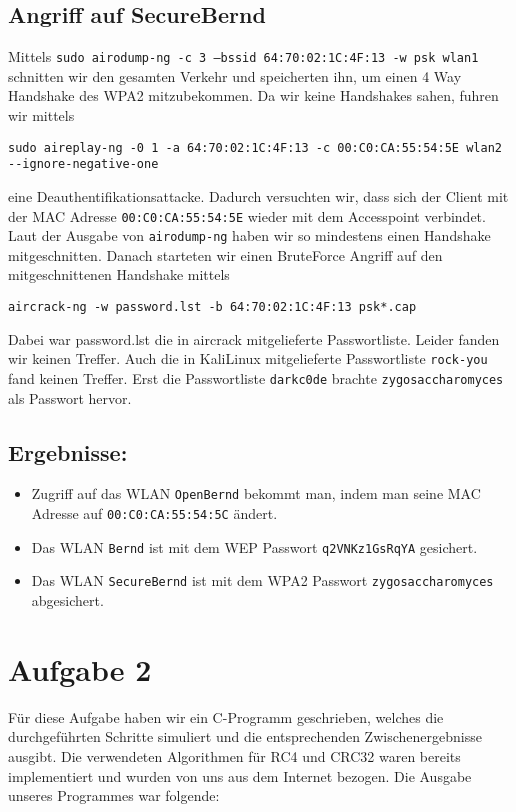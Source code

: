 \documentclass[10pt,a4paper]{article}
\begin{document}
\subsection{Angriff auf SecureBernd}

Mittels \texttt{sudo airodump-ng -c 3 --bssid 64:70:02:1C:4F:13 -w psk wlan1} schnitten wir den gesamten Verkehr und speicherten ihn, um einen 4 Way Handshake des WPA2 mitzubekommen. Da wir keine Handshakes sahen, fuhren wir mittels 
\begin{verbatim}
sudo aireplay-ng -0 1 -a 64:70:02:1C:4F:13 -c 00:C0:CA:55:54:5E wlan2 --ignore-negative-one
\end{verbatim}
eine Deauthentifikationsattacke. Dadurch versuchten wir, dass sich der Client mit der MAC Adresse
\texttt{00:C0:CA:55:54:5E} wieder mit dem Accesspoint verbindet. Laut der Ausgabe von \texttt{airodump-ng} haben wir so mindestens einen Handshake mitgeschnitten.
Danach starteten wir einen BruteForce Angriff auf den mitgeschnittenen Handshake mittels
\begin{verbatim}
aircrack-ng -w password.lst -b 64:70:02:1C:4F:13 psk*.cap
\end{verbatim}
Dabei war password.lst die in aircrack mitgelieferte Passwortliste. Leider fanden wir keinen Treffer. Auch die in KaliLinux mitgelieferte Passwortliste \texttt{rock-you} fand keinen Treffer. Erst die Passwortliste \texttt{darkc0de} brachte \texttt{zygosaccharomyces} als Passwort hervor.


\subsection{Ergebnisse:}
\begin{itemize}
	\item Zugriff auf das WLAN \texttt{OpenBernd} bekommt man, indem man seine MAC Adresse auf \texttt{00:C0:CA:55:54:5C} ändert.
	\item Das WLAN \texttt{Bernd} ist mit dem WEP Passwort \texttt{q2VNKz1GsRqYA} gesichert.
	\item Das WLAN \texttt{SecureBernd} ist mit dem WPA2 Passwort \texttt{zygosaccharomyces} abgesichert.
\end{itemize}



\section{Aufgabe 2}

Für diese Aufgabe haben wir ein C-Programm geschrieben, welches die durchgeführten Schritte simuliert und die entsprechenden Zwischenergebnisse ausgibt. Die verwendeten Algorithmen für RC4 und CRC32 waren bereits implementiert und wurden von uns aus dem Internet bezogen. Die Ausgabe unseres Programmes war folgende:
\end{document}
